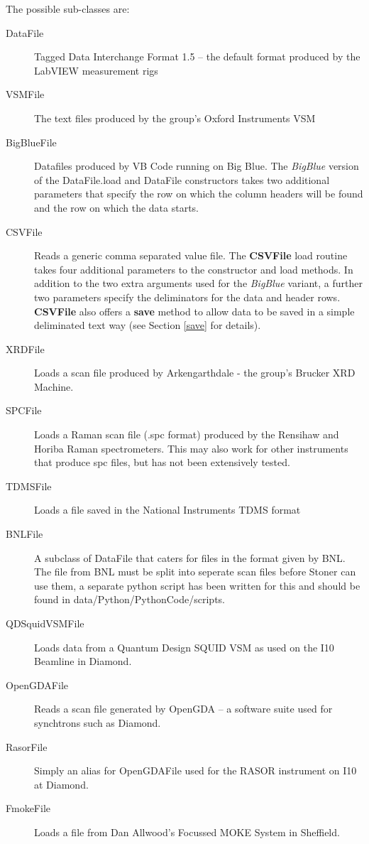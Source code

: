 \documentclass[a4paper,11pt]{scrartcl}
\begin{document}
The possible sub-classes are:
\begin{description}
\item[DataFile] Tagged Data Interchange Format 1.5 -- the default format produced by
the LabVIEW measurement rigs
\item[VSMFile] The text files produced by the group's Oxford Instruments VSM
\item[BigBlueFile] Datafiles produced by VB Code running on Big Blue. The
\textit{BigBlue} version of the DataFile.load and DataFile constructors takes
two additional parameters that specify the row on which the column headers will
be found and the row on which the data starts.
\item[CSVFile] Reads a generic comma separated value file. The \textbf{CSVFile} load
routine takes four additional parameters to the constructor and load methods. In
addition to the two extra arguments used for the \textit{BigBlue} variant, a
further two parameters specify the deliminators for the data and header rows. \textbf{CSVFile} also offers a \textbf{save} method to allow data to be saved in a simple deliminated text way (see Section \ref{save} for details).
\item[XRDFile] Loads a scan file produced by Arkengarthdale - the group's Brucker
XRD Machine.
\item[SPCFile] Loads a Raman scan file (.spc format) produced by the Rensihaw and Horiba
Raman spectrometers. This may also work for other instruments that produce spc files, but has not been extensively tested.
\item[TDMSFile] Loads a file saved in the National Instruments TDMS format

\item[BNLFile]   A subclass of DataFile that caters for files in the format given
    by BNL.  The file from BNL must be split into seperate scan files before Stoner can use
    them, a separate python script has been written for this and should be found
    in data/Python/PythonCode/scripts.
\item [QDSquidVSMFile] Loads data from a Quantum Design SQUID VSM as used on the I10 Beamline in Diamond.
\item [OpenGDAFile] Reads a scan file generated by OpenGDA -- a software suite used for synchtrons such as Diamond.
\item [RasorFile] Simply an alias for OpenGDAFile used for the RASOR instrument on I10 at Diamond.
\item [FmokeFile] Loads a file from Dan Allwood's Focussed MOKE System in Sheffield.
\end{description}
\end{document}
